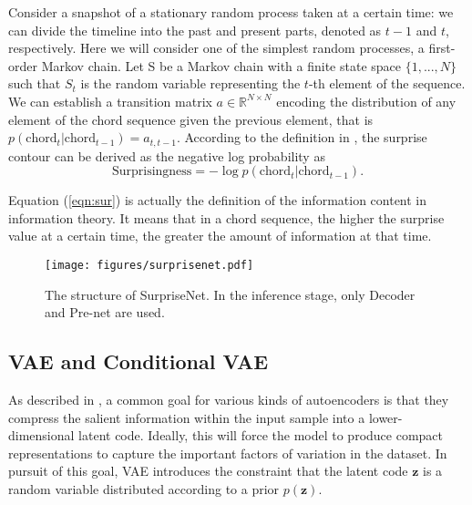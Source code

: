 \documentclass{article}
\begin{document}
 Consider a snapshot of a stationary random process taken at a certain time: we can divide the timeline into the past and present parts, denoted as $t-1$ and $t$, respectively. Here we will consider one of the simplest random processes, a first-order Markov chain. Let S be a Markov chain with a finite state space $\{1, . . . ,N\}$ such that $S_t$ is the random variable representing the $t$-th element of the sequence. We can establish a transition matrix $a \in \mathbb{R}^{N\times N}$ encoding the distribution of any element of the chord sequence given the previous element, that is $p(\text{chord}_t|\text{chord}_{t-1}) = a_{t,t-1}$. According to the definition in \cite{Abdallah2009}, the surprise contour can be derived as the negative log probability as
\begin{equation}
\label{eqn:sur}
\text{Surprisingness} = -\log p(\text{chord}_t|\text{chord}_{t-1}).
\end{equation}

Equation (\ref{eqn:sur}) is actually the definition of the information content in information theory. It means that in a chord sequence, the higher the surprise value at a certain time, the greater the amount of information at that time.

\begin{figure}[t]
\begin{center}
\texttt{[image: figures/surprisenet.pdf]}
\end{center}
\vspace{-20pt}
\caption{The structure of SurpriseNet. In the inference stage, only Decoder and Pre-net are used.}
\label{fig:surprisenet}
\vspace{-15pt}
\end{figure}

\subsection{VAE and Conditional VAE}

As described in \cite{Roberts2018}, a common goal for various kinds of autoencoders is that they compress the salient information within the input sample into a lower-dimensional latent code. Ideally, this will force the model to produce compact representations to capture the important factors of variation in the dataset. In pursuit of this goal, VAE \cite{Kingma2014,Rezende2014} introduces the constraint that the latent code $\mathbf{z}$ is a random variable distributed according to a prior $p(\mathbf{z})$.
\end{document}
